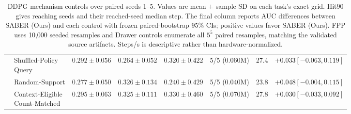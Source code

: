 \begin{table}[t]
\begin{tabular}{@{}llcccccc@{}}
 & \shortstack[l]{Shuffled-Policy\\Query} & $0.292 \pm 0.056$ & $0.264 \pm 0.052$ & $0.320 \pm 0.422$ & 5/5 (0.060M) & 27.4 & $+0.033 [-0.063,0.119]$ \\
 & Random-Support & $0.277 \pm 0.050$ & $0.326 \pm 0.134$ & $0.240 \pm 0.429$ & 5/5 (0.040M) & 23.8 & $+0.048 [-0.004,0.115]$ \\
 & \shortstack[l]{Context-Eligible\\Count-Matched} & $0.295 \pm 0.063$ & $0.325 \pm 0.111$ & $0.330 \pm 0.460$ & 5/5 (0.070M) & 27.8 & $+0.030 [-0.033,0.092]$ \\
\bottomrule
\end{tabular}
\caption{DDPG mechanism controls over paired seeds 1--5. Values are mean $\pm$ sample SD on each task's exact grid. Hit90 gives reaching seeds and their reached-seed median step. The final column reports AUC differences between SABER (Ours) and each control with frozen paired-bootstrap 95\% CIs; positive values favor SABER (Ours). FPP uses 10,000 seeded resamples and Drawer controls enumerate all $5^5$ paired resamples, matching the validated source artifacts. Steps/s is descriptive rather than hardware-normalized.}
\label{tab:supp-mechanism-controls}
\end{table}
